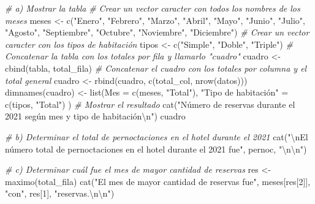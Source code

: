 \documentclass[
]{book}
\newenvironment{Shaded}{\begin{snugshade}}{\end{snugshade}}
\newcommand{\AttributeTok}[1]{\textcolor[rgb]{0.77,0.63,0.00}{#1}}
\newcommand{\CommentTok}[1]{\textcolor[rgb]{0.56,0.35,0.01}{\textit{#1}}}
\newcommand{\DecValTok}[1]{\textcolor[rgb]{0.00,0.00,0.81}{#1}}
\newcommand{\FunctionTok}[1]{\textcolor[rgb]{0.00,0.00,0.00}{#1}}
\newcommand{\NormalTok}[1]{#1}
\newcommand{\OtherTok}[1]{\textcolor[rgb]{0.56,0.35,0.01}{#1}}
\newcommand{\SpecialCharTok}[1]{\textcolor[rgb]{0.00,0.00,0.00}{#1}}
\newcommand{\StringTok}[1]{\textcolor[rgb]{0.31,0.60,0.02}{#1}}
\begin{document}
\begin{Shaded}
\begin{Highlighting}[]
\CommentTok{\# a) Mostrar la tabla}
\CommentTok{\# Crear un vector caracter con todos los nombres de los meses}
\NormalTok{meses }\OtherTok{\textless{}{-}} \FunctionTok{c}\NormalTok{(}\StringTok{"Enero"}\NormalTok{, }\StringTok{"Febrero"}\NormalTok{, }\StringTok{"Marzo"}\NormalTok{, }\StringTok{"Abril"}\NormalTok{,}
           \StringTok{"Mayo"}\NormalTok{, }\StringTok{"Junio"}\NormalTok{, }\StringTok{"Julio"}\NormalTok{, }\StringTok{"Agosto"}\NormalTok{,}
           \StringTok{"Septiembre"}\NormalTok{, }\StringTok{"Octubre"}\NormalTok{, }\StringTok{"Noviembre"}\NormalTok{, }\StringTok{"Diciembre"}\NormalTok{)}
\CommentTok{\# Crear un vector caracter con los tipos de habitación}
\NormalTok{tipos }\OtherTok{\textless{}{-}} \FunctionTok{c}\NormalTok{(}\StringTok{"Simple"}\NormalTok{, }\StringTok{"Doble"}\NormalTok{, }\StringTok{"Triple"}\NormalTok{)}
\CommentTok{\# Concatenar la tabla con los totales por fila y llamarlo "cuadro"}
\NormalTok{cuadro }\OtherTok{\textless{}{-}} \FunctionTok{cbind}\NormalTok{(tabla, total\_fila)}
\CommentTok{\# Concatenar el cuadro con los totales por columna y el total general}
\NormalTok{cuadro }\OtherTok{\textless{}{-}} \FunctionTok{rbind}\NormalTok{(cuadro, }\FunctionTok{c}\NormalTok{(total\_col, }\FunctionTok{nrow}\NormalTok{(datos)))}
\FunctionTok{dimnames}\NormalTok{(cuadro) }\OtherTok{\textless{}{-}} \FunctionTok{list}\NormalTok{(}\AttributeTok{Mes =} \FunctionTok{c}\NormalTok{(meses, }\StringTok{"Total"}\NormalTok{), }
                         \StringTok{"Tipo de habitación"} \OtherTok{=} \FunctionTok{c}\NormalTok{(tipos, }\StringTok{"Total"}\NormalTok{) )}
\CommentTok{\# Mostrar el resultado}
\FunctionTok{cat}\NormalTok{(}\StringTok{"Número de reservas durante el 2021 según mes y tipo de habitación}\SpecialCharTok{\textbackslash{}n}\StringTok{"}\NormalTok{)}
\NormalTok{cuadro}

\CommentTok{\# b) Determinar el total de pernoctaciones en el hotel durante el 2021}
\FunctionTok{cat}\NormalTok{(}\StringTok{"}\SpecialCharTok{\textbackslash{}n}\StringTok{El número total de pernoctaciones en el hotel durante el 2021 fue"}\NormalTok{, pernoc, }\StringTok{"}\SpecialCharTok{\textbackslash{}n\textbackslash{}n}\StringTok{"}\NormalTok{)}

\CommentTok{\# c) Determinar cuál fue el mes de mayor cantidad de reservas}
\NormalTok{res }\OtherTok{\textless{}{-}} \FunctionTok{maximo}\NormalTok{(total\_fila)}
\FunctionTok{cat}\NormalTok{(}\StringTok{"El mes de mayor cantidad de reservas fue"}\NormalTok{, meses[res[}\DecValTok{2}\NormalTok{]], }\StringTok{"con"}\NormalTok{, }
\NormalTok{    res[}\DecValTok{1}\NormalTok{], }\StringTok{"reservas.}\SpecialCharTok{\textbackslash{}n\textbackslash{}n}\StringTok{"}\NormalTok{)}


\end{Highlighting}
\end{Shaded}
\end{document}
